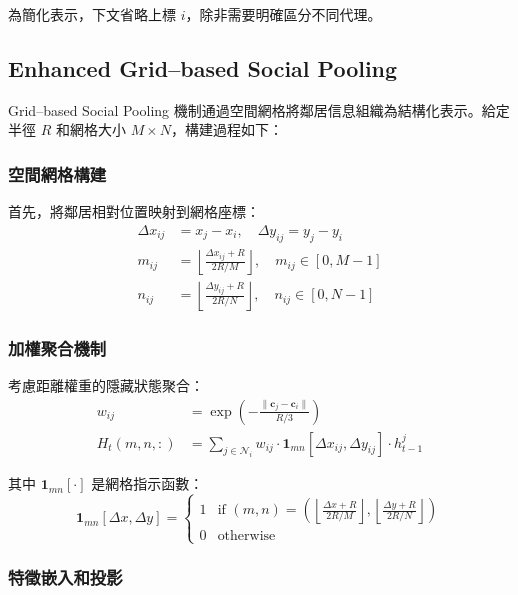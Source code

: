 \documentclass[11pt,a4paper]{article}
\begin{document}
為簡化表示，下文省略上標 $i$，除非需要明確區分不同代理。

\subsection{Enhanced Grid--based Social Pooling}\label{sec:pooling}

Grid--based Social Pooling 機制通過空間網格將鄰居信息組織為結構化表示。給定半徑 $R$ 和網格大小 $M \times N$，構建過程如下：

\subsubsection{空間網格構建}

首先，將鄰居相對位置映射到網格座標：
\begin{align}
\Delta x_{ij} &= x_j - x_i, \quad \Delta y_{ij} = y_j - y_i \\
m_{ij} &= \left\lfloor \frac{\Delta x_{ij} + R}{2R / M} \right\rfloor, \quad m_{ij} \in [0, M-1] \\
n_{ij} &= \left\lfloor \frac{\Delta y_{ij} + R}{2R / N} \right\rfloor, \quad n_{ij} \in [0, N-1]
\end{align}

\subsubsection{加權聚合機制}

考慮距離權重的隱藏狀態聚合：
\begin{align}
w_{ij} &= \exp\left(-\frac{\|\mathbf{c}_j - \mathbf{c}_i\|}{R/3}\right) \label{eq:distance_weight} \\
H_t(m,n,:) &= \sum_{j \in \mathcal{N}_i} w_{ij} \cdot \mathbf{1}_{mn}[\Delta x_{ij}, \Delta y_{ij}] \cdot h_{t-1}^j \label{eq:grid_aggregation}
\end{align}

其中 $\mathbf{1}_{mn}[\cdot]$ 是網格指示函數：
\begin{equation}
\mathbf{1}_{mn}[\Delta x, \Delta y] = \begin{cases}
1 & \text{if } (m, n) = \left(\left\lfloor \frac{\Delta x + R}{2R / M} \right\rfloor, \left\lfloor \frac{\Delta y + R}{2R / N} \right\rfloor\right) \\
0 & \text{otherwise}
\end{cases}
\end{equation}

\subsubsection{特徵嵌入和投影}
\end{document}
